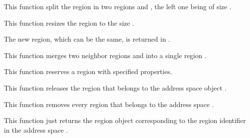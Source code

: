 	 {
	   This function split the region  in two regions
	    and , the left one being of size
	   .

	 }

	 {
	   This function resizes the region  to the
	   size .

	   The new region, which can be the same, is returned in
	   .

	 }

	 {
	   This function merges two neighbor regions  and
	    into a single region .

	 }

	 {
	   This function reserves a region with specified properties.
	 }

	 {
	   This function releases the region  that belongs
	   to the address space object .
	 }

	 {
	   This function removes every region that belongs to the
	   address space .
	 }

	 {
	   This function just returns the region object
	   corresponding to the region identifier  in the
	   address space .
	 }

